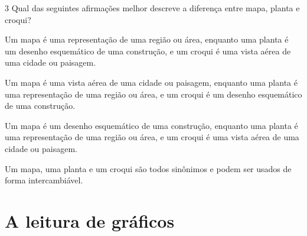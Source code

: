 {{{{\num{3}  Qual das seguintes afirmações melhor descreve a diferença entre mapa,
planta e croqui?

\begin{escolha}
\item
  Um mapa é uma representação de uma região ou área, enquanto uma planta
  é um desenho esquemático de uma construção, e um croqui é uma vista
  aérea de uma cidade ou paisagem.
\item
  Um mapa é uma vista aérea de uma cidade ou paisagem, enquanto uma
  planta é uma representação de uma região ou área, e um croqui é um
  desenho esquemático de uma construção.
\item
  Um mapa é um desenho esquemático de uma construção, enquanto uma
  planta é uma representação de uma região ou área, e um croqui é uma
  vista aérea de uma cidade ou paisagem.
\item
  Um mapa, uma planta e um croqui são todos sinônimos e podem ser usados
  de forma intercambiável.
\end{escolha}




\chapter{A leitura de gráficos}

}}}}
